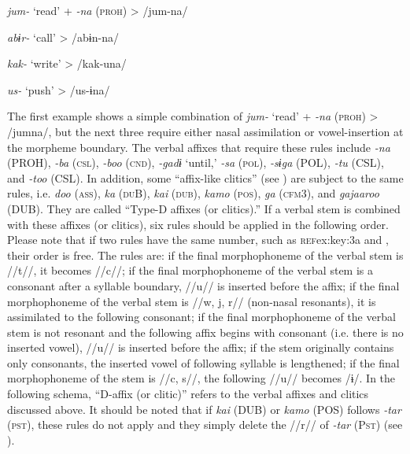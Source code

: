 \ea\label{ex:8-16}
\ea \textit{jum-}  ‘read’  +  \textit{{}-na} (\textsc{proh})  >  /jum-na/

\ex \textit{abɨr-}  ‘call’        >  /abɨn-na/

\ex \textit{kak-}  ‘write’        >  /kak-una/

\ex \textit{us-}  ‘push’        >  /us-ɨna/
\z

The first example shows a simple combination of \textit{jum-} ‘read’ + \textit{{}-na} (\textsc{proh}) > /jumna/, but the next three require either nasal assimilation or vowel-insertion at the morpheme boundary. The verbal affixes that require these rules include \textit{{}-na} (PROH), \textit{{}-ba} (\textsc{csl}), \textit{{}-boo} (\textsc{cnd}), \textit{{}-gadɨ} ‘until,’ \textit{{}-sa} (\textsc{pol}), \textit{{}-sɨga} (POL), \textit{{}-tu} (CSL), and \textit{{}-too} (CSL). In addition, some “affix-like clitics” (see ) are subject to the same rules, i.e. \textit{doo} (\textsc{ass}), \textit{ka} (\textsc{du}B), \textit{kai} (\textsc{dub}), \textit{kamo} (\textsc{pos}), \textit{ga} (\textsc{cfm}3), and \textit{gajaaroo} (DUB). They are called “Type-D affixes (or clitics).” If a verbal stem is combined with these affixes (or clitics), six rules should be applied in the following order. Please note that if two rules have the same number, such as \textsc{ref}{ex:key:3a} and , their order is free. The rules are:  if the final morphophoneme of the verbal stem is //t//, it becomes //c//;  if the final morphophoneme of the verbal stem is a consonant after a syllable boundary, //u// is inserted before the affix;  if the final morphophoneme of the verbal stem is //w, j, r// (non-nasal resonants), it is assimilated to the following consonant;  if the final morphophoneme of the verbal stem is not resonant and the following affix begins with consonant (i.e. there is no inserted vowel), //u// is inserted before the affix;  if the stem originally contains only consonants, the inserted vowel of following syllable is lengthened;  if the final morphophoneme of the stem is //c, s//, the following //u// becomes /ɨ/. In the following schema, “D-affix (or clitic)” refers to the verbal affixes and clitics discussed above. It should be noted that if \textit{kai} (DUB) or \textit{kamo} (POS) follows \textit{{}-tar} (\textsc{pst}), these rules do not apply and they simply delete the //r// of \textit{{}-tar} (P\textsc{st}) (see ).


